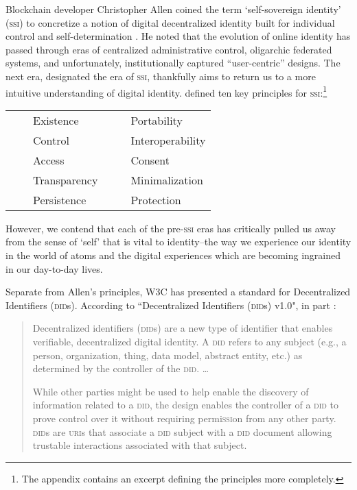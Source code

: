 \documentclass[twoside]{article}
\newcommand{\tabitem}{~~\llap{\textbullet}~~}
\begin{document}
\noindent \sloppy
Blockchain developer Christopher Allen coined the term `self-sovereign identity' (\textsc{ssi}) to concretize a notion of digital decentralized identity built for individual control and self-determination \citep{Allen2016}. He noted that the evolution of online identity has passed through eras of centralized administrative control, oligarchic federated systems, and unfortunately, institutionally captured ``user-centric'' designs. The next era, designated the era of \textsc{ssi}, thankfully aims to return us to a more intuitive understanding of digital identity. \citeauthor{Allen2016} defined ten key principles for \textsc{ssi}:\footnote{The appendix contains an excerpt defining the principles more completely.}

\begin{tabular}{ll}
  \tabitem  Existence
  &
  \tabitem  Portability \\
  \tabitem  Control
  &
  \tabitem  Interoperability \\
  \tabitem  Access
  &
  \tabitem  Consent \\
  \tabitem  Transparency
  &
  \tabitem  Minimalization \\
  \tabitem  Persistence
  &
  \tabitem  Protection \\
\end{tabular}

However, we contend that each of the pre-\textsc{ssi} eras has critically pulled us away from the sense of `self' that is vital to identity–the way we experience our identity in the world of atoms and the digital experiences which are becoming ingrained in our day-to-day lives.

Separate from Allen's principles, W3C has presented a standard for Decentralized Identifiers (\textsc{did}s). According to ``Decentralized Identifiers (\textsc{did}s) v1.0", in part \citep{W3C2022}:

\begin{quote}
Decentralized identifiers (\textsc{did}s) are a new type of identifier that enables verifiable, decentralized digital identity. A \textsc{did} refers to any subject (e.g., a person, organization, thing, data model, abstract entity, etc.) as determined by the controller of the \textsc{did}.  \ldots{}

While other parties might be used to help enable the discovery of information related to a \textsc{did}, the design enables the controller of a \textsc{did} to prove control over it without requiring permi\textsc{ssi}on from any other party. \textsc{did}s are \textsc{uri}s that associate a \textsc{did} subject with a \textsc{did} document allowing trustable interactions associated with that subject.
\end{quote}
\end{document}

